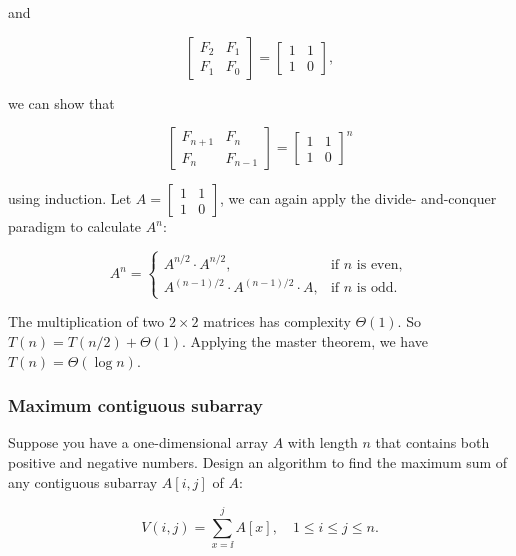 \begin{solution}
and

\[
\begin{bmatrix}
F_2 & F_1\\
F_1 & F_0
\end{bmatrix}
=\begin{bmatrix}
1 & 1\\
1 & 0
\end{bmatrix},
\]

we can show that

\[
\begin{bmatrix}
F_{n+1} & F_n\\
F_n & F_{n-1}
\end{bmatrix}
=\begin{bmatrix}
1 & 1\\
1 & 0
\end{bmatrix}^{n}
\]

using induction. Let $A=\begin{bmatrix}1 & 1 \\ 1 & 0\end{bmatrix}$, we can again apply the divide-
and-conquer paradigm to calculate $A^n$:

\[
A^n=
\begin{cases}
A^{n/2}\cdot A^{n/2}, & \text{if }n\text{ is even},\\
A^{(n-1)/2}\cdot A^{(n-1)/2}\cdot A, & \text{if }n\text{ is odd}.
\end{cases}
\]

The multiplication of two $2\times2$ matrices has complexity $\Theta(1)$. So
$T(n)=T(n/2)+\Theta(1)$. Applying the master theorem, we have $T(n)=\Theta(\log n)$.\qedhere

\end{solution}

\subsubsection*{Maximum contiguous subarray}

\begin{problem}{Suppose you have a one-dimensional array $A$ with length $n$ that contains both positive
and negative numbers. Design an algorithm to find the maximum sum of any contiguous
subarray $A[i,j]$ of $A$:}

\[
V(i,j)=\sum_{x=\ii}^{j}A[x],\quad 1\leq i\leq j\leq n.
\]

\end{problem}

